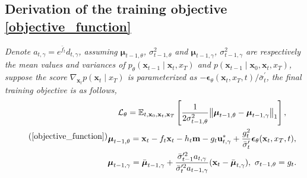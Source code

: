 \subsection{Derivation of the training objective \eqref{objective_function}}\label{proof_objective_function}
\noindent \textit{Denote $a_{t, \gamma} = e^{\bar{f}_{t}}d_{t, \gamma}$, assuming $\boldsymbol{\mu}_{t-1, \theta}$, $\sigma_{t-1, \theta}^2$ and $\boldsymbol{\mu}_{t-1, \gamma}$, $\sigma_{t-1, \gamma}^2$ are respectively the mean values and variances of $p_{\theta} (\mathbf{x}_{t-1} \mid \mathbf{x}_t, x_T)$ and $p (\mathbf{x}_{t-1} \mid \mathbf{x}_0, \mathbf{x}_t, x_T)$, suppose the score $\nabla_{\mathbf{x}_t} p(\mathbf{x}_t \mid x_T)$ is parameterized as $-\boldsymbol{\epsilon}_{\theta}(\mathbf{x}_t, x_T, t) / \bar{\sigma}_{t}^{\prime}$, the final training objective is as follows, }
\begin{equation}\tag{\ref{objective_function}}
\begin{gathered}
\mathcal{L}_{\theta} = \mathbb{E}_{t, \mathbf{x}_0, \mathbf{x}_t, \mathbf{x}_T} \left[ \frac{1}{2\sigma_{t-1, \theta}^2} \big \| \boldsymbol{\mu}_{t-1, \theta} - \boldsymbol{\mu}_{t-1, \gamma} \big \|_1 \right], \\
\boldsymbol{\mu}_{t-1, \theta} = \mathbf{x}_{t} - f_t \mathbf{x}_t - h_t \mathbf{m} - g_t \mathbf{u}_{t, \gamma}^{*} + \frac{g^2_t}{\bar{\sigma}_{t}^{\prime}} \boldsymbol{\epsilon}_{\theta}(\mathbf{x}_t, x_T, t), \\
\boldsymbol{\mu}_{t-1, \gamma} = \bar{\boldsymbol{\mu}}_{t-1, \gamma} + \frac{\bar{\sigma}_{t-1}^{\prime2}a_{t, \gamma}}{\bar{\sigma}_{t}^{\prime2}a_{t-1, \gamma} } (\mathbf{x}_t - \bar{\boldsymbol{\mu}}_{t, \gamma}),\ \sigma_{t-1, \theta} = g_t.
\end{gathered}
\end{equation}

